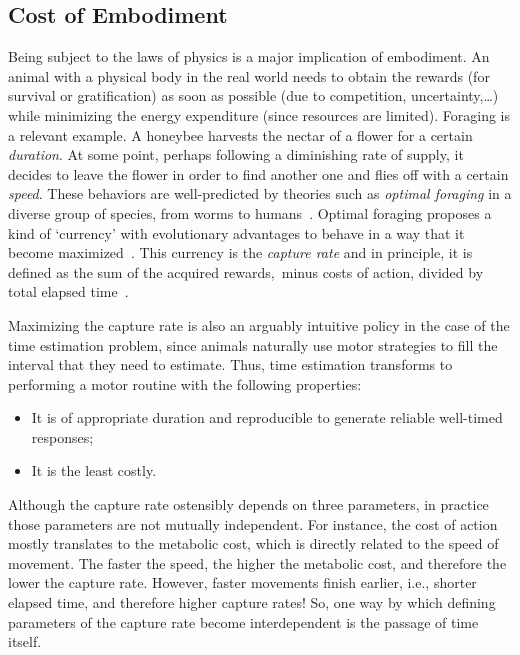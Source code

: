 \subsection{Cost of Embodiment}
\label{ch:intro:cost}
Being subject to the laws of physics is a major implication of embodiment.
An animal with a physical body in the real world needs to obtain the rewards (for survival or gratification) as soon as possible (due to competition, uncertainty,\ldots) while minimizing the energy expenditure (since resources are limited).
Foraging is a relevant example.
A honeybee harvests the nectar of a flower for a certain \textit{duration}.
At some point, perhaps following a diminishing rate of supply, it decides to leave the flower in order to find another one and flies off with a certain \textit{speed}.
These behaviors are well-predicted by theories such as \emph{optimal foraging}\! in a diverse group of species, from worms to humans~\cite{Yoon2018PNAS}.
Optimal foraging proposes a kind of `currency' with evolutionary advantages to behave in a way that it become maximized~\cite{Shadmehr2019TINS,Carland2019NeuroSci}.
This currency is the \emph{capture rate}\! and in principle, it is defined as the sum of the acquired rewards,\footnotemark\ minus costs of action, divided by total elapsed time~\cite{Shadmehr2019TINS}.
\par
Maximizing the capture rate is also an arguably intuitive policy in the case of the time estimation problem, since animals naturally use motor strategies to fill the interval that they need to estimate.
Thus, time estimation transforms to performing a motor routine with the following properties:
\begin{itemize}[noitemsep]
    \item It is of appropriate duration and reproducible to generate reliable well-timed responses;
    \item It is the least costly.
\end{itemize}
Although the capture rate ostensibly depends on three parameters, in practice those parameters are not mutually independent.
For instance, the cost of action mostly translates to the metabolic cost, which is directly related to the speed of movement.
The faster the speed, the higher the metabolic cost, and therefore the lower the capture rate.
However, faster movements finish earlier, i.e., shorter elapsed time, and therefore higher capture rates!
So, one way by which defining parameters of the capture rate become interdependent is the passage of time itself.


